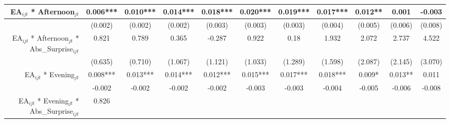 \begin{table}
{\begin{tabular}{rcccccccccc}
\multicolumn{1}{|r|}{EA$_{ijt}$ * Afternoon$_{jt}$} &
  \multicolumn{1}{c|}{0.006***} &
  \multicolumn{1}{c|}{0.010***} &
  \multicolumn{1}{c|}{0.014***} &
  \multicolumn{1}{c|}{0.018***} &
  \multicolumn{1}{c|}{0.020***} &
  \multicolumn{1}{c|}{0.019***} &
  \multicolumn{1}{c|}{0.017***} &
  \multicolumn{1}{c|}{0.012**} &
  \multicolumn{1}{c|}{0.001} &
  \multicolumn{1}{c|}{-0.003} \\ \hline
\multicolumn{1}{|r|}{} &
  \multicolumn{1}{c|}{(0.002)} &
  \multicolumn{1}{c|}{(0.002)} &
  \multicolumn{1}{c|}{(0.002)} &
  \multicolumn{1}{c|}{(0.003)} &
  \multicolumn{1}{c|}{(0.003)} &
  \multicolumn{1}{c|}{(0.003)} &
  \multicolumn{1}{c|}{(0.004)} &
  \multicolumn{1}{c|}{(0.005)} &
  \multicolumn{1}{c|}{(0.006)} &
  \multicolumn{1}{c|}{(0.008)} \\ \hline
\multicolumn{1}{|r|}{EA$_{ijt}$ * Afternoon$_{jt}$ * Abs\_Surprise$_{ijt}$} &
  \multicolumn{1}{c|}{0.821} &
  \multicolumn{1}{c|}{0.789} &
  \multicolumn{1}{c|}{0.365} &
  \multicolumn{1}{c|}{-0.287} &
  \multicolumn{1}{c|}{0.922} &
  \multicolumn{1}{c|}{0.18} &
  \multicolumn{1}{c|}{1.932} &
  \multicolumn{1}{c|}{2.072} &
  \multicolumn{1}{c|}{2.737} &
  \multicolumn{1}{c|}{4.522} \\ \hline
\multicolumn{1}{|r|}{} &
  \multicolumn{1}{c|}{(0.635)} &
  \multicolumn{1}{c|}{(0.710)} &
  \multicolumn{1}{c|}{(1.067)} &
  \multicolumn{1}{c|}{(1.121)} &
  \multicolumn{1}{c|}{(1.033)} &
  \multicolumn{1}{c|}{(1.289)} &
  \multicolumn{1}{c|}{(1.598)} &
  \multicolumn{1}{c|}{(2.087)} &
  \multicolumn{1}{c|}{(2.145)} &
  \multicolumn{1}{c|}{(3.070)} \\ \hline
\multicolumn{1}{|r|}{EA$_{ijt}$ * Evening$_{jt}$} &
  \multicolumn{1}{c|}{0.008***} &
  \multicolumn{1}{c|}{0.013***} &
  \multicolumn{1}{c|}{0.014***} &
  \multicolumn{1}{c|}{0.012***} &
  \multicolumn{1}{c|}{0.015***} &
  \multicolumn{1}{c|}{0.017***} &
  \multicolumn{1}{c|}{0.018***} &
  \multicolumn{1}{c|}{0.009*} &
  \multicolumn{1}{c|}{0.013**} &
  \multicolumn{1}{c|}{0.011} \\ \hline
\multicolumn{1}{|r|}{} &
  \multicolumn{1}{c|}{-0.002} &
  \multicolumn{1}{c|}{-0.002} &
  \multicolumn{1}{c|}{-0.002} &
  \multicolumn{1}{c|}{-0.002} &
  \multicolumn{1}{c|}{-0.003} &
  \multicolumn{1}{c|}{-0.003} &
  \multicolumn{1}{c|}{-0.004} &
  \multicolumn{1}{c|}{-0.005} &
  \multicolumn{1}{c|}{-0.006} &
  \multicolumn{1}{c|}{-0.008} \\ \hline
\multicolumn{1}{|r|}{EA$_{ijt}$ * Evening$_{jt}$ * Abs\_Surprise$_{ijt}$} &
  \multicolumn{1}{c|}{0.826} &

\end{tabular}}
\end{table}
